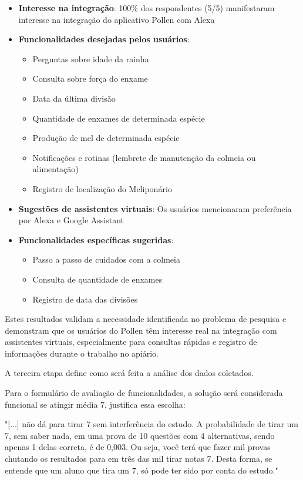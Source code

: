 \begin{itemize}
    \item \textbf{Interesse na integração}: 100\% dos respondentes (5/5) manifestaram interesse na integração do aplicativo Pollen com Alexa
    \item \textbf{Funcionalidades desejadas pelos usuários}:
    \begin{itemize}
        \item Perguntas sobre idade da rainha
        \item Consulta sobre força do enxame
        \item Data da última divisão
        \item Quantidade de enxames de determinada espécie
        \item Produção de mel de determinada espécie
        \item Notificações e rotinas (lembrete de manutenção da colmeia ou alimentação)
        \item Registro de localização do Meliponário
    \end{itemize}
    \item \textbf{Sugestões de assistentes virtuais}: Os usuários mencionaram preferência por Alexa e Google Assistant
    \item \textbf{Funcionalidades específicas sugeridas}:
    \begin{itemize}
        \item Passo a passo de cuidados com a colmeia
        \item Consulta de quantidade de enxames
        \item Registro de data das divisões
    \end{itemize}
\end{itemize}

Estes resultados validam a necessidade identificada no problema de pesquisa e demonstram que os usuários do Pollen têm interesse real na integração com assistentes virtuais, especialmente para consultas rápidas e registro de informações durante o trabalho no apiário.

A terceira etapa define como será feita a análise dos dados coletados. 

Para o formulário de avaliação de funcionalidades, a solução será considerada funcional se atingir média 7. \textcite{junek2014} justifica essa escolha:

"[...] não dá para tirar 7 sem interferência do estudo. A probabilidade de tirar um 7, sem saber nada, em uma prova de 10 questões com 4 alternativas, sendo apenas 1 delas correta, é de 0,003. Ou seja, você terá que fazer mil provas chutando os resultados para em três das mil tirar notas 7. Desta forma, se entende que um aluno que tira um 7, só pode ter sido por conta do estudo."

